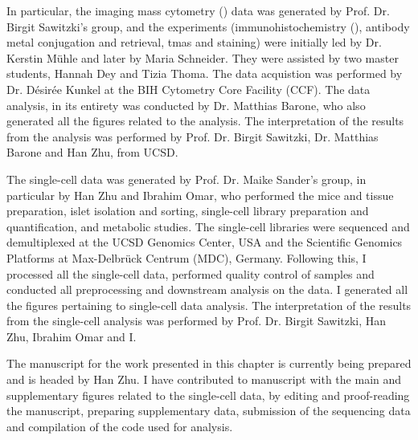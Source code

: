 \begin{Comment2}
In particular, the imaging mass cytometry () data was generated by Prof. Dr. Birgit Sawitzki's group, and the experiments (immunohistochemistry (), antibody metal conjugation and retrieval, \glspl{tma} and  staining) were initially led by Dr. Kerstin Mühle and later by Maria Schneider. They were assisted by two master students, Hannah Dey and Tizia Thoma. The  data acquistion was performed by Dr. Désirée Kunkel at the BIH Cytometry Core Facility (CCF). The  data analysis, in its entirety was conducted by Dr. Matthias Barone, who also generated all the figures related to the  analysis. The interpretation of the results from the  analysis was performed by Prof. Dr. Birgit Sawitzki, Dr. Matthias Barone and Han Zhu, from UCSD.\\
\par The single-cell data was generated by Prof. Dr. Maike Sander's group, in particular by Han Zhu and Ibrahim Omar, who performed the mice and tissue preparation, islet isolation and sorting, single-cell library preparation and quantification, and metabolic studies. The single-cell libraries were sequenced and demultiplexed at the UCSD Genomics Center, USA and the Scientific Genomics Platforms at Max-Delbrück Centrum (MDC), Germany. Following this, I processed all the single-cell data, performed quality control of samples and conducted all preprocessing and downstream analysis on the data. I generated all the figures pertaining to single-cell data analysis. The interpretation of the results from the single-cell analysis was performed by Prof. Dr. Birgit Sawitzki, Han Zhu, Ibrahim Omar and I.\\
\par The manuscript for the work presented in this chapter is currently being prepared and is headed by Han Zhu. I have contributed to manuscript with the main and supplementary figures related to the single-cell data, by editing and proof-reading the manuscript, preparing supplementary data, submission of the sequencing data and compilation of the code used for analysis.\\
\end{Comment2}

\clearpage


